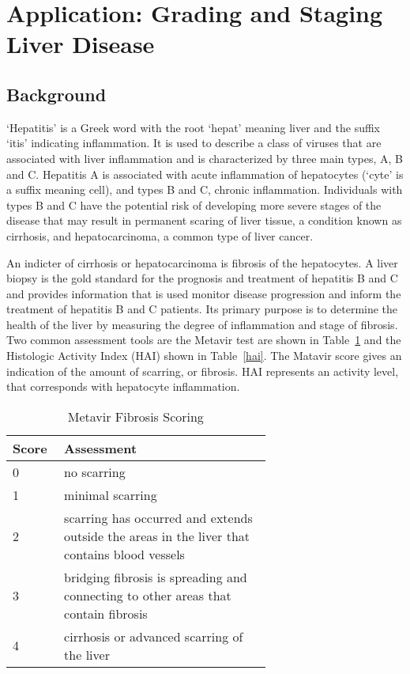 \section{Application: Grading and Staging Liver Disease}
\subsection{Background}
`Hepatitis' is a Greek word with the root `hepat' meaning liver and the suffix `itis' indicating inflammation.  It is used to describe a class of viruses that are associated with liver inflammation and is characterized by three main types, A, B and C.  Hepatitis A is associated with acute inflammation of hepatocytes (`cyte' is a suffix meaning cell), and types B and C, chronic inflammation.  Individuals with types B and C have the potential risk of developing more severe stages of the disease that may result in permanent scaring of liver tissue, a condition known as cirrhosis, and hepatocarcinoma, a common type of liver cancer.

An indicter of cirrhosis or hepatocarcinoma is fibrosis of the hepatocytes.  A liver biopsy is the gold standard for the prognosis and treatment of hepatitis B and C and provides information that is used monitor disease progression and inform the treatment of hepatitis B and C patients.     Its primary purpose is to determine the health of the liver by measuring the degree of inflammation and stage of fibrosis.  Two common assessment tools are the Metavir test are shown in Table~\ref{metavir} and the Histologic Activity Index (HAI) shown in Table~\ref{hai}.  The Matavir score gives an indication of the amount of scarring, or fibrosis.  HAI represents an activity level, that corresponds with hepatocyte inflammation.

\begin{table}[ht]
\caption{Metavir Fibrosis Scoring}
\label{metavir}
\vskip 0.15in
\begin{center}
\begin{tabular}{p{0.05\linewidth} p{0.6\linewidth}}
\hline
\textbf{Score}	&  \textbf{Assessment} \\
\hline
0         & no scarring\\
1         & minimal scarring\\
2	     & scarring has occurred and extends outside
 the areas in the liver that contains blood vessels\\
3	     & bridging fibrosis is spreading and
 connecting to other areas that contain fibrosis \\
4	     & cirrhosis or advanced scarring of the liver\\
\hline
\end{tabular}
\end{center}
\vskip -0.1in
\end{table}


